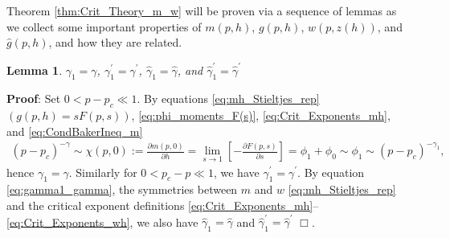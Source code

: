 \documentclass[english,12pt,jmp,graphicx]{revtex4-1}
\newtheorem{lemma}{Lemma}[section]
\newcommand{\gh}{\hat{\gamma}}
\begin{document}
Theorem \ref{thm:Crit_Theory_m_w} will be proven via a sequence of
lemmas as we collect some important properties of $m(p,h)$, $g(p,h)$,
$w(p,z(h))$, and $\hat{g}(p,h)$, and how they are related.
\begin{lemma}\label{lem:nonzero_gamma1_etc}
  $\gamma_1=\gamma$, $\gamma_1^\prime=\gamma^\prime$, $\gh_1=\gh$, and $\gh_1^\prime=\gh^\prime$
\end{lemma}
%
\noindent \textbf{Proof}:
%
Set $0<p-p_c\ll1$. By equations \eqref{eq:mh_Stieltjes_rep}
$(g(p,h)=sF(p,s))$, \eqref{eq:phi_moments_F(s)},
\eqref{eq:Crit_Exponents_mh}, and \eqref{eq:CondBakerIneq_m} 
%
\begin{align}\label{eq:gamma1_gamma}
  (p-p_c)^{-\gamma}\sim\chi(p,0)
          :=\frac{\partial m(p,0)}{\partial h}
          =\lim_{s\to1}\left[-\frac{\partial F(p,s)}{\partial s}\right]
          =\phi_1+\phi_0
          \sim\phi_1\sim(p-p_c)^{-\gamma_1},
\end{align}
%
hence $\gamma_1=\gamma$. Similarly for $0<p_c-p\ll1$, we have $\gamma_1^\prime=\gamma^\prime$. By
equation \eqref{eq:gamma1_gamma}, the symmetries between $m$ and
$w$ \eqref{eq:mh_Stieltjes_rep} and the critical exponent definitions 
\eqref{eq:Crit_Exponents_mh}--\eqref{eq:Crit_Exponents_wh}, we also
have $\gh_1=\gh$ and $\gh_1^\prime=\gh^\prime$ $\Box$.   
\end{document}
